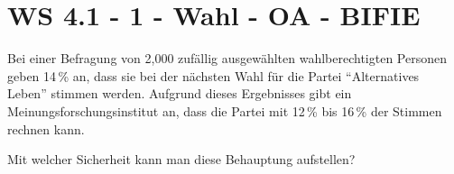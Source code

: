 \section{WS 4.1 - 1 - Wahl - OA - BIFIE}

\begin{beispiel}[WS 4.1]{1}
Bei einer Befragung von 2,000 zufällig ausgewählten wahlberechtigten Personen geben 14\,\%
an, dass sie bei der nächsten Wahl für die Partei "`Alternatives Leben"' stimmen werden. Aufgrund dieses Ergebnisses gibt ein Meinungsforschungsinstitut an, dass die Partei mit 12\,\% bis 16\,\% der Stimmen rechnen kann. 

Mit welcher Sicherheit kann man diese Behauptung aufstellen? 

\end{beispiel}